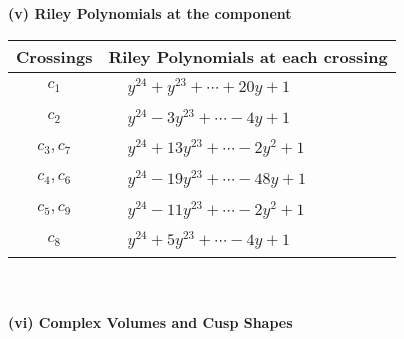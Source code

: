 \documentclass[1p]{elsarticle_modified}
\theoremstyle{definition}
\begin{document}
\newpage\renewcommand{\arraystretch}{1}
\flushleft \textbf{(v) Riley Polynomials at the component}\newline \\
\begin{tabular}{m{50pt}|m{274pt}}
Crossings & \hspace{64pt}Riley Polynomials at each crossing \\
\hline $$\begin{aligned}c_{1}\end{aligned}$$&$\begin{aligned}
&y^{24}+y^{23}+\cdots+20 y+1
\end{aligned}$\\
\hline $$\begin{aligned}c_{2}\end{aligned}$$&$\begin{aligned}
&y^{24}-3 y^{23}+\cdots-4 y+1
\end{aligned}$\\
\hline $$\begin{aligned}c_{3},c_{7}\end{aligned}$$&$\begin{aligned}
&y^{24}+13 y^{23}+\cdots-2 y^2+1
\end{aligned}$\\
\hline $$\begin{aligned}c_{4},c_{6}\end{aligned}$$&$\begin{aligned}
&y^{24}-19 y^{23}+\cdots-48 y+1
\end{aligned}$\\
\hline $$\begin{aligned}c_{5},c_{9}\end{aligned}$$&$\begin{aligned}
&y^{24}-11 y^{23}+\cdots-2 y^2+1
\end{aligned}$\\
\hline $$\begin{aligned}c_{8}\end{aligned}$$&$\begin{aligned}
&y^{24}+5 y^{23}+\cdots-4 y+1
\end{aligned}$\\
\hline
\end{tabular}\\~\\
\newpage\flushleft \textbf{(vi) Complex Volumes and Cusp Shapes}
\end{document}

